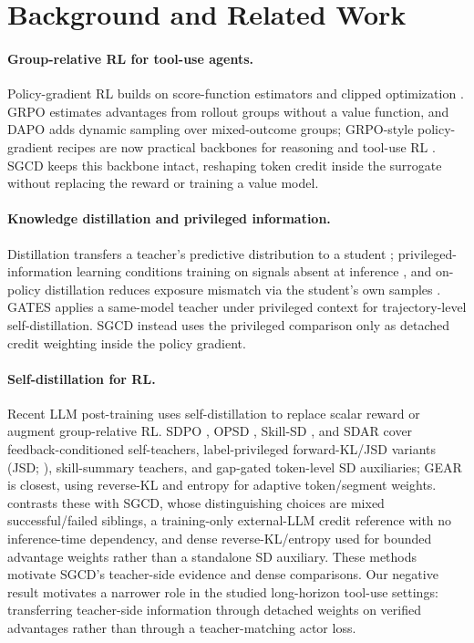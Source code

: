 \section{Background and Related Work}
\label{sec:related}

\paragraph{Group-relative RL for tool-use agents.} Policy-gradient RL builds on
score-function estimators and clipped optimization
\citep{williams1992reinforce,sutton1999policy,ppo2017}. GRPO
\citep{deepseekmath2024} estimates advantages from rollout groups without a
value function, and DAPO \citep{dapo2025} adds dynamic sampling over
mixed-outcome groups; GRPO-style policy-gradient recipes are now practical
backbones for reasoning and tool-use RL \citep{coevolve2026,multiturnguide2025}.
SGCD keeps this backbone
intact, reshaping token credit inside the surrogate without replacing the reward
or training a value model.

\paragraph{Knowledge distillation and privileged information.} Distillation
transfers a teacher's predictive distribution to a student \citep{hinton2015};
privileged-information learning conditions training on signals absent at
inference \citep{vapnik2015lupi}, and on-policy distillation reduces exposure
mismatch via the student's own samples \citep{agarwal2024onpolicykd}. GATES
\citep{gates2026} applies a same-model teacher under privileged context for
trajectory-level self-distillation. SGCD instead uses the privileged comparison
only as detached credit weighting inside the policy gradient.

\paragraph{Self-distillation for RL.} Recent LLM post-training uses
self-distillation to replace scalar reward or augment group-relative RL. SDPO
\citep{sdpo2026}, OPSD \citep{opsd2026}, Skill-SD \citep{skillsd2026}, and SDAR
\citep{sdar2026} cover feedback-conditioned self-teachers, label-privileged
forward-KL/JSD variants (JSD; \citealp{lin1991jsd}), skill-summary teachers,
and gap-gated token-level SD auxiliaries; GEAR \citep{gear2026} is closest,
using reverse-KL and entropy for
adaptive token/segment weights.  contrasts these with
SGCD, whose distinguishing choices are mixed successful/failed siblings, a
training-only external-LLM credit reference with no inference-time dependency,
and dense reverse-KL/entropy used for bounded advantage weights rather than a
standalone SD auxiliary. These methods motivate SGCD's teacher-side evidence and
dense comparisons. Our negative result motivates a narrower role in the studied
long-horizon tool-use settings: transferring teacher-side information through
detached weights on verified advantages rather than through a teacher-matching
actor loss.

